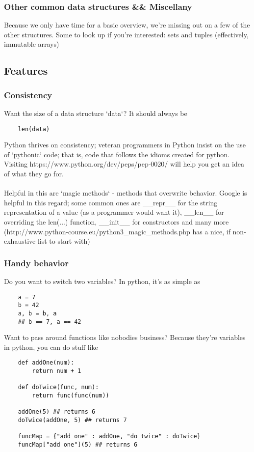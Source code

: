 \documentclass{article}
\begin{document}
\subsubsection{Other common data structures \&\& Miscellany}
Because we only have time for a basic overview, we're missing out on a few of the other structures. Some to look up if you're interested: sets and tuples (effectively, immutable arrays)

\subsection{Features}
\subsubsection{Consistency}
Want the size of a data structure `data`? It should always be
\begin{verbatim}
    len(data)
\end{verbatim}
Python thrives on consistency; veteran programmers in Python insist on the use of `pythonic` code; that is, code that follows the idioms created for python. Visiting https://www.python.org/dev/peps/pep-0020/ will help you get an idea of what they go for.\\\\
Helpful in this are `magic methods` - methods that overwrite behavior. Google is helpful in this regard; some common ones are \_\_repr\_\_ for the string representation of a value (as a programmer would want it), \_\_len\_\_ for overriding the len(...) function, \_\_init\_\_ for constructors and many more\\
(http://www.python-course.eu/python3\_magic\_methods.php has a nice, if non-exhaustive list to start with)

\subsubsection{Handy behavior}
Do you want to switch two variables? In python, it's as simple as
\begin{verbatim}
    a = 7
    b = 42
    a, b = b, a
    ## b == 7, a == 42
\end{verbatim}

Want to pass around functions like nobodies business? Because they're variables in python, you can do stuff like
\begin{verbatim}
    def addOne(num):
        return num + 1
    
    def doTwice(func, num):
        return func(func(num))
    
    addOne(5) ## returns 6
    doTwice(addOne, 5) ## returns 7
    
    funcMap = {"add one" : addOne, "do twice" : doTwice}
    funcMap["add one"](5) ## returns 6
\end{verbatim}
\end{document}
